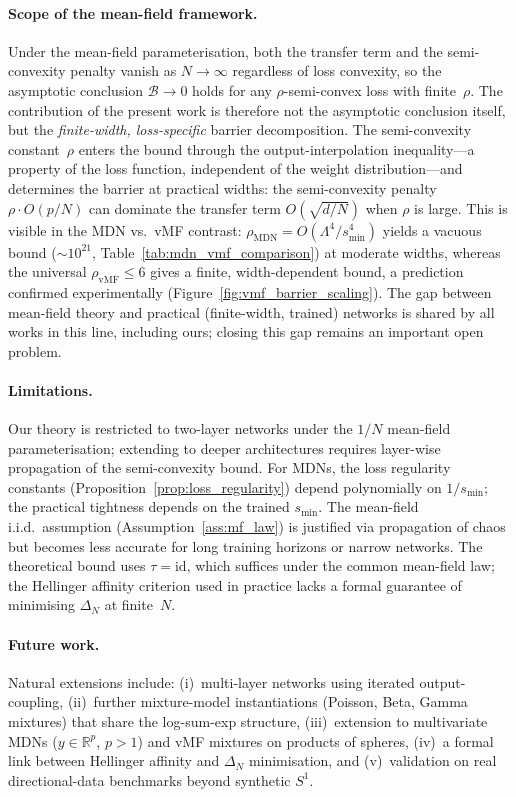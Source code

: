 \documentclass[11pt]{article}
\newcommand{\R}{\mathbb{R}}
\newcommand{\cB}{\mathcal{B}}
\DeclareMathOperator{\vmf}{vMF}
\begin{document}
\paragraph{Scope of the mean-field framework.}
Under the mean-field parameterisation, both the transfer term
and the semi-convexity penalty vanish as $N\to\infty$
regardless of loss convexity, so the asymptotic conclusion
$\cB\to 0$ holds for any $\rho$-semi-convex loss with finite~$\rho$.
The contribution of the present work is therefore not the
asymptotic conclusion itself, but the \emph{finite-width,
loss-specific} barrier decomposition.
The semi-convexity constant~$\rho$ enters the bound through
the output-interpolation inequality---a property of the loss
function, independent of the weight distribution---and
determines the barrier at practical widths: the semi-convexity
penalty $\rho\cdot O(p/N)$ can dominate the transfer term
$O(\sqrt{d/N})$ when $\rho$ is large.
This is visible in the MDN vs.\ vMF contrast:
$\rho_{\mathrm{MDN}} = O(\Lambda^4/s_{\min}^4)$ yields
a vacuous bound ($\sim\!10^{21}$, Table~\ref{tab:mdn_vmf_comparison})
at moderate widths, whereas the universal
$\rho_{\vmf} \le 6$ gives a finite, width-dependent bound,
a prediction confirmed experimentally
(Figure~\ref{fig:vmf_barrier_scaling}).
The gap between mean-field theory and practical (finite-width,
trained) networks is shared by all works in this line, including
ours; closing this gap remains an important open problem.

\paragraph{Limitations.}
Our theory is restricted to two-layer networks under the $1/N$
mean-field parameterisation; extending to deeper architectures
requires layer-wise propagation of the semi-convexity bound.
For MDNs, the loss regularity constants
(Proposition~\ref{prop:loss_regularity}) depend polynomially on
$1/s_{\min}$; the practical tightness depends on the trained
$s_{\min}$.
The mean-field i.i.d.\ assumption (Assumption~\ref{ass:mf_law})
is justified via propagation of chaos but becomes less accurate
for long training horizons or narrow networks.
The theoretical bound uses $\tau = \mathrm{id}$, which suffices
under the common mean-field law; the Hellinger affinity criterion
used in practice lacks a formal guarantee of minimising $\Delta_N$
at finite~$N$.

\paragraph{Future work.}
Natural extensions include:
(i)~multi-layer networks using iterated output-coupling,
(ii)~further mixture-model instantiations (Poisson, Beta, Gamma
mixtures) that share the log-sum-exp structure,
(iii)~extension to multivariate MDNs ($y \in \R^p$, $p > 1$)
and vMF mixtures on products of spheres,
(iv)~a formal link between Hellinger affinity and $\Delta_N$
minimisation, and
(v)~validation on real directional-data benchmarks beyond synthetic $S^1$.
\end{document}
